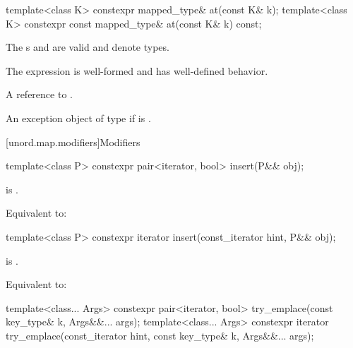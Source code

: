 %
%
\begin{itemdecl}
template<class K> constexpr mapped_type&       at(const K& k);
template<class K> constexpr const mapped_type& at(const K& k) const;
\end{itemdecl}

\begin{itemdescr}
\pnum
\constraints
The s  and
 are valid and denote types.

\pnum
\expects
The expression  is well-formed and has well-defined behavior.

\pnum
\returns
A reference to .

\pnum
\throws
An exception object of type 
if  is .
\end{itemdescr}

[unord.map.modifiers]{Modifiers}

%
\begin{itemdecl}
template<class P>
  constexpr pair<iterator, bool> insert(P&& obj);
\end{itemdecl}

\begin{itemdescr}

\pnum
\constraints
{} is .

\pnum
\effects
Equivalent to: 
\end{itemdescr}

%
\begin{itemdecl}
template<class P>
  constexpr iterator insert(const_iterator hint, P&& obj);
\end{itemdecl}

\begin{itemdescr}
\pnum
\constraints
{} is .

\pnum
\effects
Equivalent to:
\end{itemdescr}

%
\begin{itemdecl}
template<class... Args>
  constexpr pair<iterator, bool> try_emplace(const key_type& k, Args&&... args);
template<class... Args>
  constexpr iterator try_emplace(const_iterator hint, const key_type& k, Args&&... args);
\end{itemdecl}

